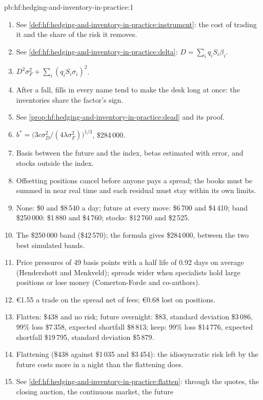 \begin{solution}{pb:hf:hedging-and-inventory-in-practice:1}
\begin{enumerate}
\item See \cref{def:hf:hedging-and-inventory-in-practice:instrument}: the cost of trading it and the share of the risk it removes.
\item See \cref{def:hf:hedging-and-inventory-in-practice:delta}: $D=\sum_iq_iS_i\beta_i$.
\item $D^2\sigma_F^2+\sum_i(q_iS_i\sigma_i)^2$.
\item After a fall, fills in every name tend to make the desk long at once: the inventories share the factor's sign.
\item See \cref{prop:hf:hedging-and-inventory-in-practice:dead} and its proof.
\item $b^\ast=\bigl(3c\sigma_D^2/(4\lambda\sigma_F^2)\bigr)^{1/3}$, \$284\,000.
\item Basis between the future and the index, betas estimated with error, and stocks outside the index.
\item Offsetting positions cancel before anyone pays a spread; the books must be summed in near real time and each residual must stay within its own
limits.
\item None: \$0 and \$8\,540 a day; future at every move: \$6\,700 and \$4\,410; band \$250\,000: \$1\,880 and \$4\,760; stocks: \$12\,760 and \$2\,525.
\item The \$250\,000 band (\$42\,570); the formula gives \$284\,000, between the two best simulated bands.
\item Price pressures of 49 basis points with a half life of 0.92 days on average (Hendershott and Menkveld); spreads wider when specialists hold
large positions or lose money (Comerton-Forde and co-authors).
\item \euro1.55 a trade on the spread net of fees; \euro0.68 lost on positions.
\item Flatten: \$438 and no risk; future overnight: \$83, standard deviation \$3\,086, 99\% loss \$7\,358, expected shortfall \$8\,813; keep: 99\% loss
\$14\,776, expected shortfall \$19\,795, standard deviation \$5\,879.
\item Flattening (\$438 against \$1\,035 and \$3\,454): the idiosyncratic risk left by the future costs more in a night than the flattening does.
\item See \cref{def:hf:hedging-and-inventory-in-practice:flatten}: through the quotes, the closing auction, the continuous market, the future

\end{enumerate}
\end{solution}
